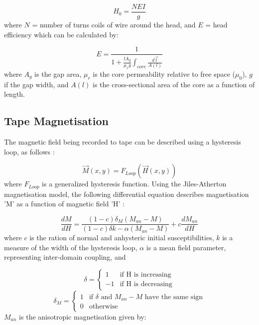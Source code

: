 \documentclass[twoside,a4paper]{article}
\begin{document}
\begin{equation}
    H_0 = \frac{NEI}{g}
\end{equation}
%
where $N$ = number of turns coils of wire around the head, and $E$ = head 
efficiency which can be calculated by:

\begin{equation}
    E = \frac{1}{1 + \frac{l  A_g}{\mu_r g} \int_{core} \frac {d \vec{l}}{A(l)}}
\end{equation}
%
where $A_g$ is the gap area, $\mu_r$ is the core permeability relative to 
free space ($\mu_0$), $g$ if the gap width, and $A(l)$ is the cross-sectional 
area of the core as a function of length.

\subsection{Tape Magnetisation}
The magnetic field being recorded to tape can be described using 
a hysteresis loop, as follows \cite{1994tmr..book.....B}:

\begin{equation}
    \vec{M}(x,y) = F_{Loop}(\vec{H}(x,y))
\end{equation}
%
where $F_{Loop}$ is a generalized hysteresis function.
\newline\newline
Using the Jiles-Atherton magnetisation model, the following
differential equation describes magnetisation 'M' as a function 
of magnetic field 'H' \cite{Hysteresis}:

\begin{equation}
    \frac{dM}{dH} = \frac{(1-c) \delta_M (M_{an} - M)}{(1-c) \delta k - \alpha (M_{an} - M)} + c \frac{dM_{an}}{dH}
    \label{eq5}
\end{equation}
%
where $c$ is the ration of normal and anhysteric initial susceptibilities,
$k$ is a measure of the width of the hysteresis
loop, $\alpha$ is a mean field parameter, representing inter-domain
coupling, and

\begin{equation}
    \delta = \begin{cases}
        1 & \text{if H is increasing} \\
        -1 & \text{if H is decreasing}
    \end{cases}
\end{equation}
\begin{equation}
    \delta_M = \begin{cases}
        1 & \text{if $\delta$ and $M_{an} - M$ have the same sign} \\
        0 & \text{otherwise}
    \end{cases}
\end{equation}
%
$M_{an}$ is the anisotropic magnetisation given by:
\end{document}
